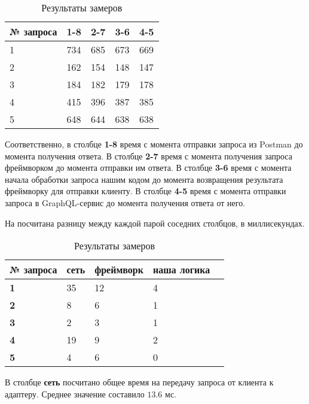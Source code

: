 \noindent
\begingroup
\centering
\small %
\begin{table} [htbp]
	\centering\small
	\caption{Результаты замеров}%
	\label{tab:performance-slices}
	\begin{tabular}{|l|l|l|l|l|}
		\hline
		№ запроса & 1-8 & 2-7 & 3-6 & 4-5 \\ \hline
		\hline
		1 & 734 & 685 & 673 & 669 \\ \hline
		2 & 162 & 154 & 148 & 147 \\ \hline
		3 & 184 & 182 & 179 & 178 \\ \hline
		4 & 415 & 396 & 387 & 385 \\ \hline
		5 & 648 & 644 & 638 & 638 \\ \hline
	\end{tabular}
\end{table}
\normalsize
\endgroup

Соответственно, в столбце \textbf{1-8} время с момента отправки запроса из Postman до момента получения ответа.
В столбце \textbf{2-7} время с момента получения запроса фреймворком до момента отправки им ответа.
В столбце \textbf{3-6} время с момента начала обработки запроса нашим кодом до момента возвращения результата фреймворку для отправки клиенту.
В столбце \textbf{4-5} время с момента отправки запроса в GraphQL-сервис до момента получения ответа от него.

На  посчитана разницу между каждой парой соседних столбцов, в миллисекундах.

\noindent
\begingroup
\centering
\small %
\begin{table} [htbp]
	\centering\small
	\caption{Результаты замеров}%
	\label{tab:performance-slices-diff}
	\begin{tabular}{|l|l|l|l|l|}
		\hline
		\textbf{№ запроса} & \textbf{сеть} & \textbf{фреймворк} & \textbf{наша логика} \\ \hline
		\hline
		\textbf{1} & 35 & 12 &  4 \\ \hline
		\textbf{2} &  8 &  6 &  1 \\ \hline
		\textbf{3} &  2 &  3 &  1 \\ \hline
		\textbf{4} & 19 &  9 &  2 \\ \hline
		\textbf{5} &  4 &  6 &  0 \\ \hline
	\end{tabular}
\end{table}
\normalsize
\endgroup

В столбце \textbf{сеть} посчитано общее время на передачу запроса от клиента к адаптеру.
Среднее значение составило $13.6$ мс.

